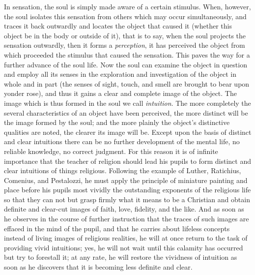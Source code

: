 In sensation, the soul is simply made aware of a certain stimulus. When, however, the soul isolates this sensation from others which may occur simultaneously, and traces it back outwardly and locates the object that caused it (whether this object be in the body or outside of it), that is to say, when the soul projects the sensation outwardly, then it forms a \emph{perception}, it has perceived the object from which proceeded the stimulus that caused the sensation. This paves the way for a further advance of the soul life. Now the soul can examine the object in question and employ all its senses in the exploration and investigation of the object in whole and in part (the senses of sight, touch, and smell are brought to bear upon yonder rose), and thus it gains a clear and complete image of the object. The image which is thus formed in the soul we call \emph{intuition}. The more completely the several characteristics of an object have been perceived, the more distinct will be the image formed by the soul; and the more plainly the object's distinctive qualities are noted, the clearer its image will be. Except upon the basis of distinct and clear intuitions there can be no further development of the mental life, no reliable knowledge, no correct judgment. For this reason it is of infinite importance that the teacher of religion should lead his pupils to form distinct and clear intuitions of things religious. Following the example of Luther, Ratichius, Comenius, and Pestalozzi, he must apply the principle of miniature painting and place before his pupils most vividly the outstanding exponents of the religious life
so that they can not but grasp firmly what it means to be a Christian and obtain definite and clear-cut images of faith, love, fidelity, and the like. And as soon as he observes in the course of further instruction that the traces of such images are effaced in the mind of the pupil, and that he carries about lifeless concepts instead of living images of religious realities, he will at once return to the task of providing vivid intuitions; yes, he will not wait until this calamity has occurred but try to forestall it; at any rate, he will restore the vividness of intuition as soon as he discovers that it is becoming less definite and clear.

